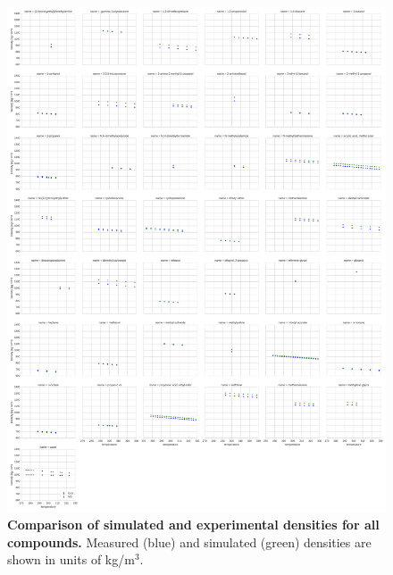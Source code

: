 \documentclass[aps,pre,twocolumn,nofootinbib,superscriptaddress,linenumbers]{revtex4-1}
\begin{document}
\begin{figure}

\includegraphics[width=\textwidth]{./figures/densities_versus_temperature_all.pdf}

\caption{{\bf Comparison of simulated and experimental densities for all compounds.} 
Measured (blue) and simulated (green) densities are shown in units of kg/m$^3$.
}
\label{figure:AllDensities}

\end{figure}

\end{document}

